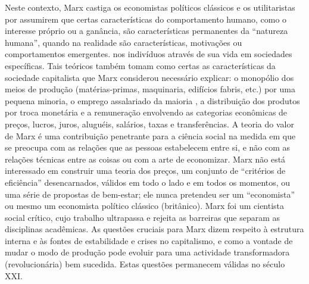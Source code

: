 Neste contexto, Marx castiga os economistas políticos clássicos e os utilitaristas por assumirem que certas características do comportamento humano, como o interesse próprio ou a ganância, são características permanentes da “natureza humana”, quando na realidade são características, motivações ou comportamentos emergentes. nos indivíduos através de sua vida em sociedades específicas. Tais teóricos também tomam como certas as características da sociedade capitalista que Marx considerou necessário explicar: o monopólio dos meios de produção (matérias-primas, maquinaria, edifícios fabris, etc.) por uma pequena minoria, o emprego assalariado da maioria , a distribuição dos produtos por troca monetária e a remuneração envolvendo as categorias econômicas de preços, lucros, juros, aluguéis, salários, taxas e transferências. A teoria do valor de Marx é uma contribuição penetrante para a ciência social na medida em que se preocupa com as relações que as pessoas estabelecem entre si, e não com as relações técnicas entre as coisas ou com a arte de economizar. Marx não está interessado em construir uma teoria dos preços, um conjunto de “critérios de eficiência” desencarnados, válidos em todo o lado e em todos os momentos, ou uma série de propostas de bem-estar; ele nunca pretendeu ser um “economista” ou mesmo um economista político clássico (britânico). Marx foi um cientista social crítico, cujo trabalho ultrapassa e rejeita as barreiras que separam as disciplinas acadêmicas. As questões cruciais para Marx dizem respeito à estrutura interna e às fontes de estabilidade e crises no capitalismo, e como a vontade de mudar o modo de produção pode evoluir para uma actividade transformadora (revolucionária) bem sucedida. Estas questões permanecem válidas no século XXI.
 \par 
